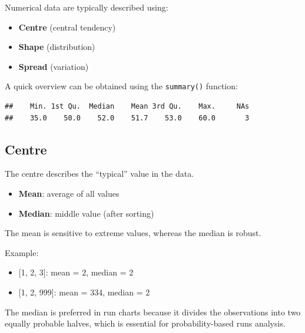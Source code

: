 \documentclass[
]{book}
\newenvironment{Shaded}{\begin{snugshade}}{\end{snugshade}}
\newcommand{\CommentTok}[1]{\textcolor[rgb]{0.56,0.35,0.01}{\textit{#1}}}
\newcommand{\FunctionTok}[1]{\textcolor[rgb]{0.13,0.29,0.53}{\textbf{#1}}}
\newcommand{\NormalTok}[1]{#1}
\newcommand{\SpecialCharTok}[1]{\textcolor[rgb]{0.81,0.36,0.00}{\textbf{#1}}}
\providecommand{\tightlist}{%
  \setlength{\itemsep}{0pt}\setlength{\parskip}{0pt}}
\begin{document}
Numerical data are typically described using:

\begin{itemize}
\tightlist
\item
  \textbf{Centre} (central tendency)
\item
  \textbf{Shape} (distribution)
\item
  \textbf{Spread} (variation)
\end{itemize}

A quick overview can be obtained using the \texttt{summary()} function:

\begin{Shaded}
\end{Shaded}

\begin{verbatim}
##    Min. 1st Qu.  Median    Mean 3rd Qu.    Max.     NAs 
##    35.0    50.0    52.0    51.7    53.0    60.0       3
\end{verbatim}

\subsection{Centre}\label{centre}

The centre describes the ``typical'' value in the data.

\begin{itemize}
\tightlist
\item
  \textbf{Mean}: average of all values
\item
  \textbf{Median}: middle value (after sorting)
\end{itemize}

The mean is sensitive to extreme values, whereas the median is robust.

Example:

\begin{itemize}
\tightlist
\item
  {[}1, 2, 3{]}: mean = 2, median = 2
\item
  {[}1, 2, 999{]}: mean = 334, median = 2
\end{itemize}

The median is preferred in run charts because it divides the
observations into two equally probable halves, which is essential for
probability-based runs analysis.
\end{document}
